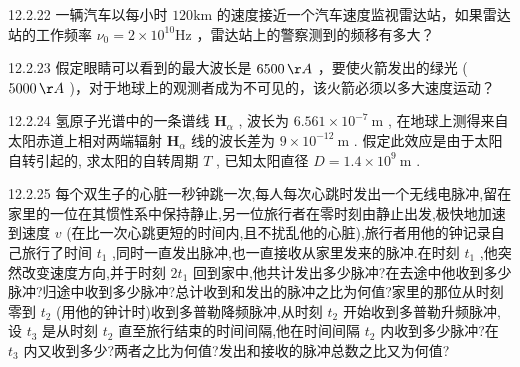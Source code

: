 \begin{problem}{12.2.22}
一辆汽车以每小时 $120\mathrm{km}$ 的速度接近一个汽车速度监视雷达站，如果雷达站的工作频率 $\nu_0 = 2\times 10^{10}\mathrm{Hz}$ ，雷达站上的警察测到的频移有多大？
\end{problem}
\clearpage


\begin{problem}{12.2.23}
假定眼睛可以看到的最大波长是 $6500 \, \AA$ ，要使火箭发出的绿光 ( $5000 \, \AA$ )，对于地球上的观测者成为不可见的，该火箭必须以多大速度运动？
\end{problem}
\clearpage


\begin{problem}{12.2.24}
氢原子光谱中的一条谱线 $\mathbf{H}_{\alpha}$ , 波长为 $6.561 \times 10^{-7} \mathrm{~m}$ , 在地球上测得来自太阳赤道上相对两端辐射 $\mathbf{H}_{\alpha}$ 线的波长差为 $9 \times 10^{-12} \mathrm{~m}$ . 假定此效应是由于太阳自转引起的, 求太阳的自转周期 $T$ , 已知太阳直径 $D = 1.4 \times 10^{9} \mathrm{~m}$ .
\end{problem}
\clearpage


\begin{problem}{12.2.25}
每个双生子的心脏一秒钟跳一次,每人每次心跳时发出一个无线电脉冲,留在家里的一位在其惯性系中保持静止,另一位旅行者在零时刻由静止出发,极快地加速到速度 $v$ (在比一次心跳更短的时间内,且不扰乱他的心脏),旅行者用他的钟记录自己旅行了时间 $t_1$ ,同时一直发出脉冲,也一直接收从家里发来的脉冲.在时刻 $t_1$ ,他突然改变速度方向,并于时刻 $2t_1$ 回到家中,他共计发出多少脉冲?在去途中他收到多少脉冲?归途中收到多少脉冲?总计收到和发出的脉冲之比为何值?家里的那位从时刻零到 $t_2$ (用他的钟计时)收到多普勒降频脉冲,从时刻 $t_2$ 开始收到多普勒升频脉冲,设 $t_3$ 是从时刻 $t_2$ 直至旅行结束的时间间隔,他在时间间隔 $t_2$ 内收到多少脉冲?在 $t_3$ 内又收到多少?两者之比为何值?发出和接收的脉冲总数之比又为何值?
\end{problem}
\clearpage


